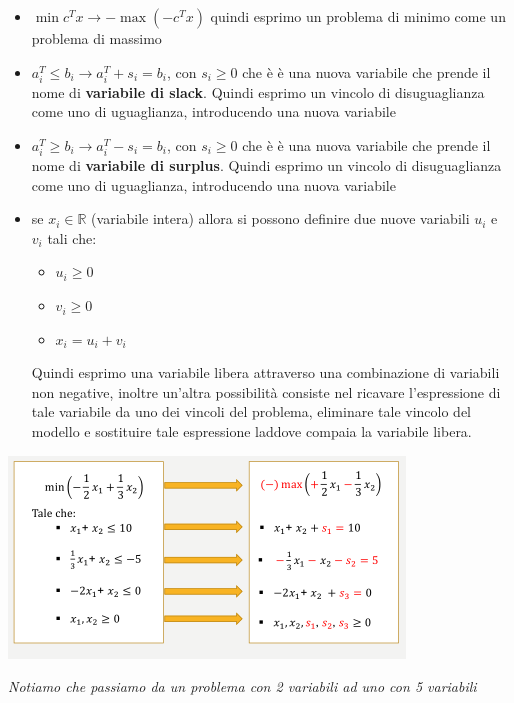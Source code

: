 \documentclass[a4paper,12pt, oneside]{book}
\begin{document}
\begin{itemize}
  \item $\min c^Tx \to -\max (-c^Tx)$ quindi esprimo un problema di
  minimo come un problema di massimo
  \item $a_i^T\leq b_i \to a_i^T+s_i=b_i$, con $s_i\geq 0$ che è è una
  nuova variabile che prende il nome di \textbf{variabile di
    slack}. Quindi esprimo un vincolo di disuguaglianza come uno di
  uguaglianza, introducendo una nuova variabile
  \item $a_i^T\geq b_i \to a_i^T-s_i=b_i$, con $s_i\geq 0$ che è è una
  nuova variabile che prende il nome di \textbf{variabile di
    surplus}. Quindi esprimo un vincolo di disuguaglianza come uno di
  uguaglianza, introducendo una nuova variabile
  \item se $x_i\in \mathbb{R}$ (variabile intera) allora si possono
  definire due nuove variabili $u_i$ e $v_i$ tali che:
  \begin{itemize}
    \item $u_i\geq 0$
    \item $v_i\geq 0$
    \item $x_i=u_i+v_i$
  \end{itemize}
  Quindi esprimo una variabile libera attraverso una combinazione
  di variabili non negative, inoltre un'altra possibilità consiste nel
  ricavare l’espressione di tale variabile da uno dei vincoli del
  problema, eliminare tale vincolo del modello e sostituire tale
  espressione laddove compaia la variabile libera.
\end{itemize}
\begin{esempio}
  \begin{center}
    \includegraphics[scale = 0.8]{img/sim.png}
  \end{center}
  \textit{Notiamo che passiamo da un problema con 2 variabili ad
    uno con 5 variabili}
\end{esempio}
\end{document}

